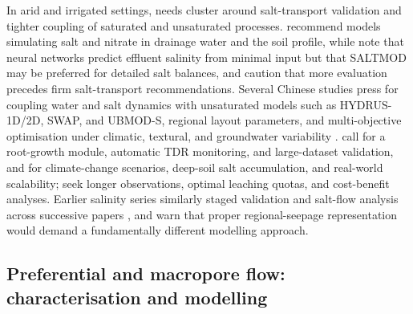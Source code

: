 In arid and irrigated settings, needs cluster around salt-transport validation
and tighter coupling of saturated and unsaturated processes.
\textcite{Ebrahimian2015} recommend models simulating salt and nitrate in
drainage water and the soil profile, while \textcite{Sarangi2006} note that
neural networks predict effluent salinity from minimal input but that SALTMOD
may be preferred for detailed salt balances, and \textcite{Hirekhan2007} caution
that more evaluation precedes firm salt-transport recommendations. Several
Chinese studies press for coupling water and salt dynamics with unsaturated
models such as HYDRUS-1D/2D, SWAP, and UBMOD-S, regional layout parameters, and
multi-objective optimisation under climatic, textural, and groundwater
variability \parencite{Han2025,Wang2025c,Wang2024c}. \textcite{Liu2022} call for
a root-growth module, automatic TDR monitoring, and large-dataset validation,
and \textcite{Liu2026} for climate-change scenarios, deep-soil salt
accumulation, and real-world scalability; \textcite{Guo2025} seek longer
observations, optimal leaching quotas, and cost-benefit analyses. Earlier
salinity series similarly staged validation and salt-flow analysis across
successive papers \parencite{KARAJEH1994}, and \textcite{Kelleners2000} warn
that proper regional-seepage representation would demand a fundamentally
different modelling approach.

\subsection{Preferential and macropore flow: characterisation and modelling}

